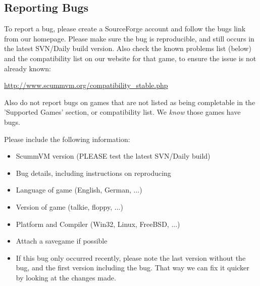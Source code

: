 


\subsection{Reporting Bugs} \label{sect-reporting-bugs}

To report a bug, please create a SourceForge account and follow the bugs
link from our homepage. Please make sure the bug is reproducible, and
still occurs in the latest SVN/Daily build version. Also check the known
problems list (below) and the compatibility list on our website for that
game, to ensure the issue is not already known:

  \url{http://www.scummvm.org/compatibility_stable.php}

Also do not report bugs on games that are not listed as being completable
in the 'Supported Games' section, or compatibility list. We \textit{know} those
games have bugs.

Please include the following information:
\begin{itemize}
\item ScummVM version (PLEASE test the latest SVN/Daily build)
\item Bug details, including instructions on reproducing
\item Language of game (English, German, ...)
\item Version of game (talkie, floppy, ...)
\item Platform and Compiler (Win32, Linux, FreeBSD, ...)
\item Attach a savegame if possible
\item If this bug only occurred recently, please note the last
          version without the bug, and the first version including
          the bug. That way we can fix it quicker by looking at the
          changes made.
\end{itemize}
